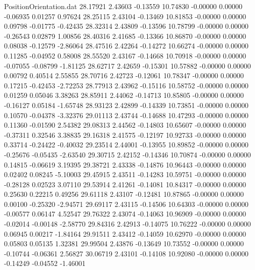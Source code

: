 \begin{filecontents}{PositionOrientation.dat}
  28.17921    2.43603   -0.13559    10.74830   -0.00000    0.00000   -0.06935    0.01257    0.97624
  28.25115    2.43104   -0.13469    10.81853   -0.00000    0.00000    0.09798   -0.01775   -0.42435
  28.32314    2.43809   -0.13596    10.78799   -0.00000    0.00000   -0.26543    0.02879    1.00856
  28.40316    2.41685   -0.13366    10.86870   -0.00000    0.00000    0.08038   -0.12579   -2.86064
  28.47516    2.42264   -0.14272    10.66274   -0.00000    0.00000    0.11285   -0.04952    0.58008
  28.55520    2.43167   -0.14668    10.70918   -0.00000    0.00000   -0.07055   -0.08799   -1.81125
  28.62717    2.42659   -0.15301    10.57882   -0.00000    0.00000    0.00792    0.40514    2.55855
  28.70716    2.42723   -0.12061    10.78347   -0.00000    0.00000    0.17215   -0.42453   -2.72253
  28.77913    2.43962   -0.15116    10.58752   -0.00000    0.00000    0.01259    0.05046    3.38263
  28.85911    2.44062   -0.14713    10.85805   -0.00000    0.00000   -0.16127    0.05184   -1.65748
  28.93123    2.42899   -0.14339    10.73851   -0.00000    0.00000    0.10570   -0.04378   -3.32376
  29.01113    2.43744   -0.14688    10.47293   -0.00000    0.00000    0.11360   -0.01590    2.54382
  29.08313    2.44562   -0.14803    10.65607   -0.00000    0.00000   -0.37311    0.32546    3.38835
  29.16318    2.41575   -0.12197    10.92733   -0.00000    0.00000    0.33714   -0.24422   -0.40032
  29.23514    2.44001   -0.13955    10.89852   -0.00000    0.00000   -0.25676   -0.05435   -2.63540
  29.30715    2.42152   -0.14346    10.70874   -0.00000    0.00000    0.14815   -0.06619    3.19395
  29.38721    2.43338   -0.14876    10.96443   -0.00000    0.00000    0.02402    0.08245   -5.10003
  29.45915    2.43511   -0.14283    10.59751   -0.00000    0.00000   -0.28128    0.02523    3.07110
  29.53914    2.41261   -0.14081    10.84317   -0.00000    0.00000    0.25630    0.22215    0.49256
  29.61118    2.43107   -0.12481    10.87865   -0.00000    0.00000    0.00100   -0.25320   -2.94571
  29.69117    2.43115   -0.14506    10.64303   -0.00000    0.00000   -0.00577    0.06147    4.52547
  29.76322    2.43074   -0.14063    10.96909   -0.00000    0.00000   -0.02014   -0.00148   -2.58770
  29.84316    2.42913   -0.14075    10.76222   -0.00000    0.00000    0.06945    0.00217   -1.84164
  29.91511    2.43412   -0.14059    10.62970   -0.00000    0.00000    0.05803    0.05135    1.32381
  29.99504    2.43876   -0.13649    10.73552   -0.00000    0.00000   -0.10744   -0.06361    2.56827
  30.06719    2.43101   -0.14108    10.92080   -0.00000    0.00000   -0.14249   -0.04552   -1.46001

\end{filecontents}
